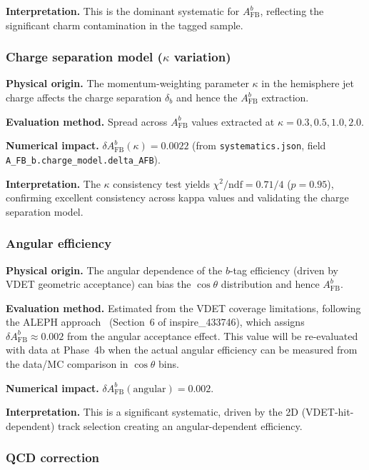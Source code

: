 \documentclass[11pt,a4paper]{article}
\begin{document}
\textbf{Interpretation.} This is the dominant systematic for $A_\mathrm{FB}^b$,
reflecting the significant charm contamination in the tagged sample.

\subsubsection{Charge separation model ($\kappa$ variation)}
\label{sec:syst_kappa}

\textbf{Physical origin.} The momentum-weighting parameter $\kappa$ in the hemisphere
jet charge affects the charge separation $\delta_b$ and hence the $A_\mathrm{FB}^b$ extraction.

\textbf{Evaluation method.} Spread across $A_\mathrm{FB}^b$ values extracted at
$\kappa = 0.3, 0.5, 1.0, 2.0$.

\textbf{Numerical impact.}
$\delta A_\mathrm{FB}^b(\kappa) = 0.0022$
(from \texttt{systematics.json}, field \texttt{A\_FB\_b.charge\_model.delta\_AFB}).

\textbf{Interpretation.} The $\kappa$ consistency test yields $\chi^2/\mathrm{ndf} = 0.71/4$
($p = 0.95$), confirming excellent consistency across kappa values and validating the
charge separation model.

\subsubsection{Angular efficiency}
\label{sec:syst_angular}

\textbf{Physical origin.} The angular dependence of the $b$-tag efficiency (driven by
VDET geometric acceptance) can bias the $\cos\theta$ distribution and hence $A_\mathrm{FB}^b$.

\textbf{Evaluation method.} Estimated from the VDET coverage limitations, following the
ALEPH approach~\cite{ALEPH:Rb:1996} (Section~6 of inspire\_433746), which assigns
$\delta A_\mathrm{FB}^b \approx 0.002$ from the angular acceptance effect. This value
will be re-evaluated with data at Phase~4b when the actual angular efficiency can be
measured from the data/MC comparison in $\cos\theta$ bins.

\textbf{Numerical impact.}
$\delta A_\mathrm{FB}^b(\mathrm{angular}) = 0.002$.

\textbf{Interpretation.} This is a significant systematic, driven by the 2D (VDET-hit-dependent)
track selection creating an angular-dependent efficiency.

\subsubsection{QCD correction}
\label{sec:syst_qcd}
\end{document}
